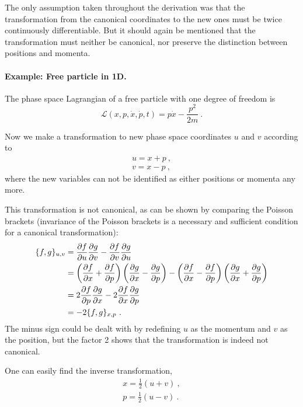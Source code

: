 \documentclass{scrartcl}
\newcommand{\PSL}{\mathcal{L}}
\begin{document}
The only assumption taken throughout the derivation was that the transformation from the canonical coordinates to the new ones must be twice continuously differentiable. But it should again be mentioned that the transformation must neither be canonical, nor preserve the distinction between positions and momenta. 

\paragraph{Example: Free particle in 1D.} The phase space Lagrangian of a free particle with one degree of freedom is
\begin{equation*}
\PSL(x,p,\dot{x},\dot{p},t) = p\dot{x} - \frac{p^2}{2m} \ .
\end{equation*}

Now we make a transformation to new phase space coordinates $u$ and $v$ according to
\begin{align*}
u = x+p \ ,\\
v = x-p \ ,
\end{align*}
where the new variables can not be identified as either positions or momenta any more. 

This transformation is not canonical, as can be shown by comparing the Poisson brackets (invariance of the Poisson brackets is a necessary and sufficient condition for a canonical transformation):
\begin{align*}
\lbrace f,g \rbrace_{u,v} &= \pdv{f}{u}\pdv{g}{v} - \pdv{f}{v}\pdv{g}{u} \\
&= \left(\pdv{f}{x}+\pdv{f}{p}\right)\left(\pdv{g}{x}-\pdv{g}{p}\right) - \left(\pdv{f}{x}-\pdv{f}{p}\right)\left(\pdv{g}{x}+\pdv{g}{p}\right) \\
&= 2\pdv{f}{p}\pdv{g}{x} - 2\pdv{f}{x}\pdv{g}{p} \\
&= -2\lbrace f,g\rbrace_{x,p} \ .
\end{align*}
The minus sign could be dealt with by redefining $u$ as the momentum and $v$ as the position, but the factor 2 shows that the transformation is indeed not canonical. 


One can easily find the inverse transformation,
\begin{align*}
x = \frac12(u+v) \ ,\\
p = \frac12(u-v) \ .
\end{align*}
\end{document}
